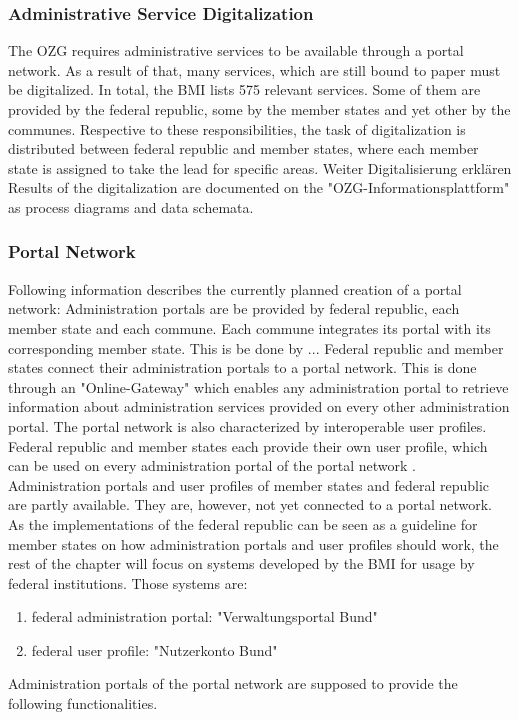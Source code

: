 \documentclass[
     12pt,         %
     a4paper,      %
     BCOR=10mm,version=first,     %
     DIV=14,version=first,        %
     ]{scrreprt}
\begin{document}
\subsubsection{Administrative Service Digitalization}

The OZG requires administrative services to be available through a portal network. As a result of that, many services, which are still bound to paper must be digitalized.
In total, the BMI lists 575 relevant services. Some of them are provided by the federal republic, some by the member states and yet other by the communes. Respective to these responsibilities, the task of digitalization is distributed between federal republic and member states, where each member state is assigned to take the lead for specific areas. \cite{BMI:Onlinezugangsgesetz}
Weiter Digitalisierung erklären
Results of the digitalization are documented on the "OZG-Informationsplattform" \cite{BMI:Informatiosplattform} as process diagrams and data schemata.

\subsubsection{Portal Network}

Following information describes the currently planned creation of a portal network:
Administration portals are be provided by federal republic, each member state and each commune.
Each commune integrates its portal with its corresponding member state. This is be done by ... 
Federal republic and member states connect their administration portals to a portal network. This is done through an "Online-Gateway" which enables any administration portal to retrieve information about administration services provided on every other administration portal. The portal network is also characterized by interoperable user profiles. Federal republic and member states each provide their own user profile, which can be used on every administration portal of the portal network \cite{Cotar:Drucksache_19/12775}.
Administration portals and user profiles of member states and federal republic are partly available. They are, however, not yet connected to a portal network. As the implementations of the federal republic can be seen as a guideline for member states on how administration portals and user profiles should work, the rest of the chapter will focus on systems developed by the BMI for usage by federal institutions. Those systems are:
\begin{enumerate}
    \item federal administration portal: "Verwaltungsportal Bund" \cite{BMI:Verwaltungsportal_Bund}
    \item federal user profile: "Nutzerkonto Bund" \cite{BMI:Nutzerkonto_Bund}
\end{enumerate}
Administration portals of the portal network are supposed to provide the following functionalities.
\end{document}
